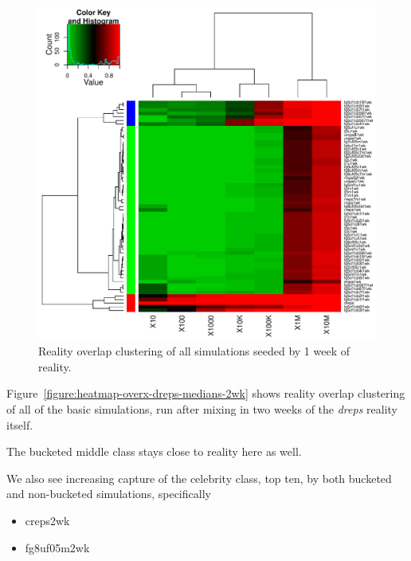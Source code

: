 \documentclass[10pt,oneside]{memoir}
\begin{document}
\begin{Spacing}{2}
\begin{figure}
\begin{center}
    \includegraphics{figures/crop/heatmap-overx-dreps-medians-1wk}
    \caption{Reality overlap clustering of all simulations seeded by 1 week of reality.}
    \label{figure:heatmap-overx-dreps-medians-1wk}
\end{center}
\end{figure}
Figure~\ref{figure:heatmap-overx-dreps-medians-2wk} shows reality overlap clustering of all of the basic simulations, run after mixing in two weeks of the {\itshape dreps} reality itself.


The bucketed middle class stays close to reality here as well.


We also see increasing capture of the celebrity class, top ten, by both bucketed and non-bucketed simulations, specifically


\begin{itemize}


\item creps2wk

\item fg8uf05m2wk
\end{itemize}



\end{Spacing}
\end{document}
